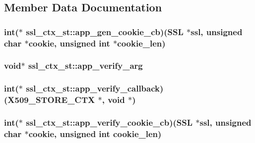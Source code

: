 \subsection{Member Data Documentation}
\hypertarget{structssl__ctx__st_a96ce9710410a943020c5fd45378ec539}{
\subsubsection[{app\-\_\-gen\-\_\-cookie\-\_\-cb}]{\setlength{\rightskip}{0pt plus 5cm}int($\ast$ ssl\-\_\-ctx\-\_\-st\-::app\-\_\-gen\-\_\-cookie\-\_\-cb)(S\-S\-L $\ast$ssl, unsigned char $\ast$cookie, unsigned int $\ast$cookie\-\_\-len)}}\label{structssl__ctx__st_a96ce9710410a943020c5fd45378ec539}
\hypertarget{structssl__ctx__st_ac65736129c311f93009b7f3d67b95bcf}{
\subsubsection[{app\-\_\-verify\-\_\-arg}]{\setlength{\rightskip}{0pt plus 5cm}void$\ast$ ssl\-\_\-ctx\-\_\-st\-::app\-\_\-verify\-\_\-arg}}\label{structssl__ctx__st_ac65736129c311f93009b7f3d67b95bcf}
\hypertarget{structssl__ctx__st_a1f66a04c28f7896e13eb1fe8aa0f388e}{
\subsubsection[{app\-\_\-verify\-\_\-callback}]{\setlength{\rightskip}{0pt plus 5cm}int($\ast$ ssl\-\_\-ctx\-\_\-st\-::app\-\_\-verify\-\_\-callback)(X509\-\_\-\-S\-T\-O\-R\-E\-\_\-\-C\-T\-X $\ast$, void $\ast$)}}\label{structssl__ctx__st_a1f66a04c28f7896e13eb1fe8aa0f388e}
\hypertarget{structssl__ctx__st_a1db4843c271681af790f0eadf15c46d3}{
\subsubsection[{app\-\_\-verify\-\_\-cookie\-\_\-cb}]{\setlength{\rightskip}{0pt plus 5cm}int($\ast$ ssl\-\_\-ctx\-\_\-st\-::app\-\_\-verify\-\_\-cookie\-\_\-cb)(S\-S\-L $\ast$ssl, unsigned char $\ast$cookie, unsigned int cookie\-\_\-len)}}\label{structssl__ctx__st_a1db4843c271681af790f0eadf15c46d3}
